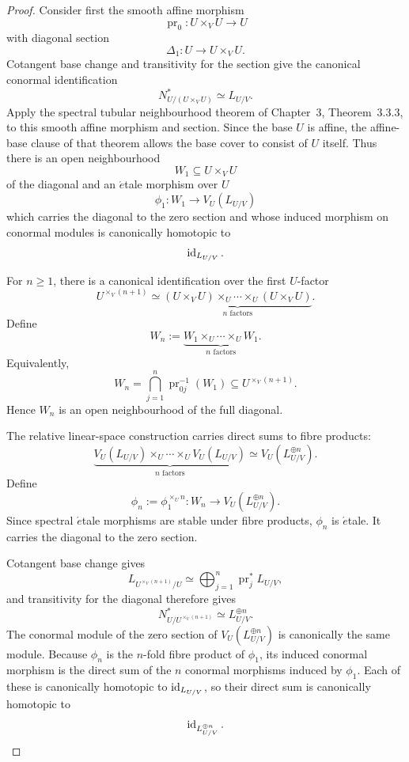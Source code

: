 \begin{proof}
Consider first the smooth affine morphism
\[
    \operatorname{pr}_0:
    U\times_VU
    \longrightarrow
    U
\]
with diagonal section
\[
    \Delta_1:U\longrightarrow U\times_VU.
\]
Cotangent base change and transitivity for the section give the canonical conormal identification
\[
    N^*_{U/(U\times_VU)}
    \simeq
    L_{U/V}.
\]
Apply the spectral tubular neighbourhood theorem of Chapter~3, Theorem~3.3.3, to this smooth affine
morphism and section.  Since the base \(U\) is affine, the affine-base clause of that theorem allows
the base cover to consist of \(U\) itself.  Thus there is an open neighbourhood
\[
    W_1\subseteq U\times_VU
\]
of the diagonal and an \(\acute{e}\)tale morphism over \(U\)
\[
    \phi_1:
    W_1
    \longrightarrow
    V_U(L_{U/V})
\]
which carries the diagonal to the zero section and whose induced morphism on
conormal modules is canonically homotopic to
\[
    \operatorname{id}_{L_{U/V}}.
\]

For \(n\geq1\), there is a canonical identification over the first \(U\)-factor
\[
    U^{\times_V(n+1)}
    \simeq
    \underbrace{
        (U\times_VU)\times_U\cdots\times_U(U\times_VU)
    }_{n\text{ factors}}.
\]
Define
\[
\boxed{
    W_n
    :=
    \underbrace{
        W_1\times_U\cdots\times_UW_1
    }_{n\text{ factors}}.
}
\]
Equivalently,
\[
    W_n
    =
    \bigcap_{j=1}^n
    \operatorname{pr}_{0j}^{-1}(W_1)
    \subseteq
    U^{\times_V(n+1)}.
\]
Hence \(W_n\) is an open neighbourhood of the full diagonal.

The relative linear-space construction carries direct sums to fibre products:
\[
    \underbrace{
        V_U(L_{U/V})\times_U\cdots\times_UV_U(L_{U/V})
    }_{n\text{ factors}}
    \simeq
    V_U(L_{U/V}^{\oplus n}).
\]
Define
\[
\boxed{
    \phi_n
    :=
    \phi_1^{\times_Un}:
    W_n
    \longrightarrow
    V_U(L_{U/V}^{\oplus n}).
}
\]
Since spectral \(\acute{e}\)tale morphisms are stable under fibre products, \(\phi_n\) is
\(\acute{e}\)tale.  It carries the diagonal to the zero section.

Cotangent base change gives
\[
    L_{U^{\times_V(n+1)}/U}
    \simeq
    \bigoplus_{j=1}^n\operatorname{pr}_j^*L_{U/V},
\]
and transitivity for the diagonal therefore gives
\[
\boxed{
    N^*_{U/U^{\times_V(n+1)}}
    \simeq
    L_{U/V}^{\oplus n}.
}
\]
The conormal module of the zero section of
\(V_U(L_{U/V}^{\oplus n})\) is canonically the same module.  Because
\(\phi_n\) is the \(n\)-fold fibre product of \(\phi_1\), its induced
conormal morphism is the direct sum of the \(n\) conormal morphisms induced
by \(\phi_1\).  Each of these is canonically homotopic to
\(\operatorname{id}_{L_{U/V}}\), so their direct sum is canonically homotopic to
\[
    \operatorname{id}_{L_{U/V}^{\oplus n}}.
\]


\end{proof}
